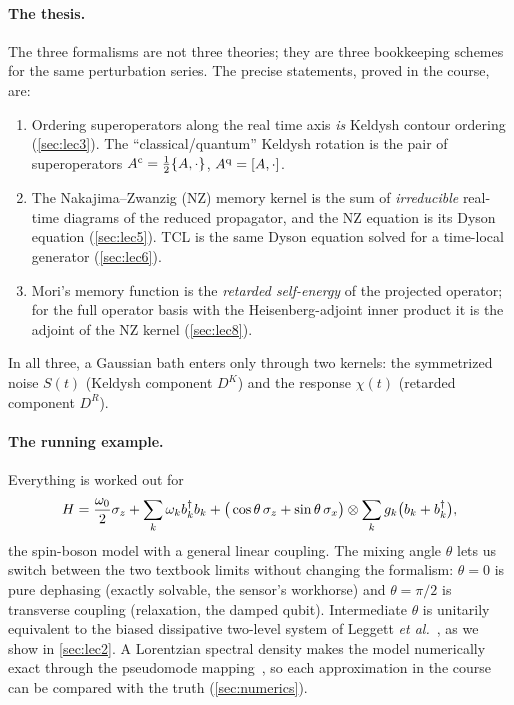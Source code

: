 \paragraph{The thesis.}
The three formalisms are not three theories; they are three bookkeeping schemes for the same perturbation series.
The precise statements, proved in the course, are:
\begin{keybox}
\begin{enumerate}[itemsep=1pt]
\item Ordering superoperators along the real time axis \emph{is} Keldysh contour ordering (\cref{sec:lec3}).
  The ``classical/quantum'' Keldysh rotation is the pair of superoperators $A^{\mathrm{c}}=\tfrac12\{A,\cdot\}$, $A^{\mathrm{q}}=[A,\cdot]$.
\item The Nakajima--Zwanzig (NZ) memory kernel is the sum of \emph{irreducible} real-time diagrams of the reduced propagator, and the NZ equation is its Dyson equation (\cref{sec:lec5}).
  TCL is the same Dyson equation solved for a time-local generator (\cref{sec:lec6}).
\item Mori's memory function is the \emph{retarded self-energy} of the projected operator; for the full operator basis with the Heisenberg-adjoint inner product it is the adjoint of the NZ kernel (\cref{sec:lec8}).
\end{enumerate}
In all three, a Gaussian bath enters only through two kernels: the symmetrized noise $S(t)$ (Keldysh component $D^K$) and the response $\chi(t)$ (retarded component $D^R$).
\end{keybox}

\paragraph{The running example.}
Everything is worked out for
\begin{equation}
  H=\frac{\omega_0}{2}\sigma_z+\sum_k\omega_kb_k^\dagger b_k
  +\big(\cos\theta\,\sigma_z+\sin\theta\,\sigma_x\big)\otimes\sum_kg_k\big(b_k+b_k^\dagger\big),
  \label{eq:model-intro}
\end{equation}
the spin-boson model with a general linear coupling.
The mixing angle $\theta$ lets us switch between the two textbook limits without changing the formalism: $\theta=0$ is pure dephasing (exactly solvable, the sensor's workhorse) and $\theta=\pi/2$ is transverse coupling (relaxation, the damped qubit).
Intermediate $\theta$ is unitarily equivalent to the biased dissipative two-level system of Leggett \emph{et al.}~\cite{Leggett1987}, as we show in \cref{sec:lec2}.
A Lorentzian spectral density makes the model numerically exact through the pseudomode mapping~\cite{Garraway1997,Tamascelli2018}, so each approximation in the course can be compared with the truth (\cref{sec:numerics}).

